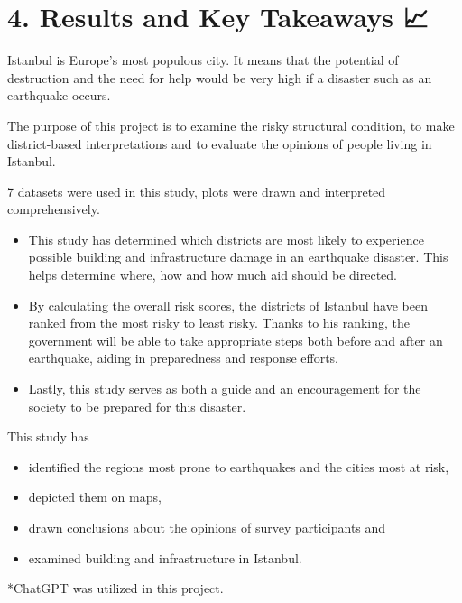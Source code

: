 \documentclass[
  11pt,
  a4paper,
  DIV=11,
  numbers=noendperiod]{scrartcl}
\providecommand{\tightlist}{%
  \setlength{\itemsep}{0pt}\setlength{\parskip}{0pt}}\usepackage{longtable,booktabs,array}
\begin{document}
\hypertarget{results-and-key-takeaways}{%
\section{4. Results and Key Takeaways
📈}\label{results-and-key-takeaways}}

Istanbul is Europe's most populous city. It means that the potential of
destruction and the need for help would be very high if a disaster such
as an earthquake occurs.

The purpose of this project is to examine the risky structural
condition, to make district-based interpretations and to evaluate the
opinions of people living in Istanbul.

7 datasets were used in this study, plots were drawn and interpreted
comprehensively.

\begin{itemize}
\tightlist
\item
  This study has determined which districts are most likely to
  experience possible building and infrastructure damage in an
  earthquake disaster. This helps determine where, how and how much aid
  should be directed.
\item
  By calculating the overall risk scores, the districts of Istanbul have
  been ranked from the most risky to least risky. Thanks to his ranking,
  the government will be able to take appropriate steps both before and
  after an earthquake, aiding in preparedness and response efforts.
\item
  Lastly, this study serves as both a guide and an encouragement for the
  society to be prepared for this disaster.
\end{itemize}

This study has

\begin{itemize}
\item
  identified the regions most prone to earthquakes and the cities most
  at risk,
\item
  depicted them on maps,
\item
  drawn conclusions about the opinions of survey participants and
\item
  examined building and infrastructure in Istanbul.
\end{itemize}

*ChatGPT was utilized in this project.
\end{document}
